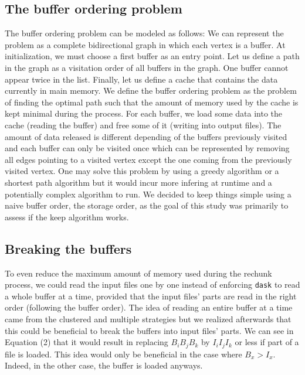 \documentclass[conference]{IEEEtran}
\begin{document}
\subsection{The buffer ordering problem}
The buffer ordering problem can be modeled as follows: We can represent the
problem as a complete bidirectional graph in which each vertex is a buffer. At
initialization, we must choose a first buffer as an entry point. Let us define
a path in the graph as a visitation order of all buffers in the graph. One buffer
cannot appear twice in the list. Finally, let us define a cache that contains
the data currently in main memory. We define the buffer ordering problem as the
problem of finding the optimal path such that the amount of memory used by the
cache is kept minimal during the process. For each buffer, we load some data
into the cache (reading the buffer) and free some of it (writing into output files). The amount of
data released is different depending of the buffers previously visited and each
buffer can only be visited once which can be represented by removing all edges
pointing to a visited vertex except the one coming from the previously visited
vertex. One may solve this problem by using a greedy algorithm or a shortest path
algorithm but it would
incur more infering at runtime and a potentially complex algorithm to run.
We decided to keep things simple using a naive buffer order, the storage order,
as the goal of this study was primarily to assess if the keep algorithm works.

\subsection{Breaking the buffers}
To even reduce the maximum amount of memory used during the rechunk process, we
could read the input files one by one instead of enforcing \texttt{dask} to read a whole
buffer at a time, provided that the input files' parts are read in the right
order (following the buffer order). The idea of reading an entire buffer at a
time came from the clustered and multiple strategies but we realized afterwards
that this could be beneficial to break the buffers into input files' parts. We
can see in Equation (2) that it would result in replacing $B_iB_jB_k$ by
$I_iI_jI_k$ or less if part of a file is loaded. This idea would only be
beneficial in the case where $B_x>I_x$. Indeed, in the other case, the buffer is
loaded anyways.
\end{document}
